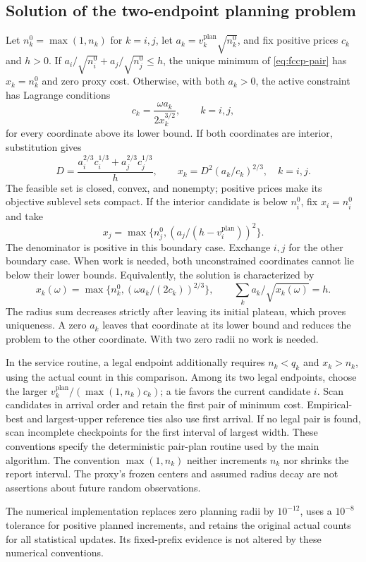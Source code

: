 \documentclass[11pt]{article}
\theoremstyle{remark}
\begin{document}
\subsection{Solution of the two-endpoint planning problem}
Let $n_k^0=\max(1,n_k)$ for $k=i,j$, let
$a_k=v_k^{\mathrm{plan}}\sqrt{n_k^0}$, and fix positive prices $c_k$
and $h>0$. If
$a_i/\sqrt{n_i^0}+a_j/\sqrt{n_j^0}\le h$, the unique minimum of
\eqref{eq:fccp-pair} has $x_k=n_k^0$ and zero proxy cost. Otherwise,
with both $a_k>0$, the active constraint has Lagrange conditions
\[
 c_k=\frac{\omega a_k}{2x_k^{3/2}},\qquad k=i,j,
\]
for every coordinate above its lower bound. If both coordinates are
interior, substitution gives
\begin{equation}\label{eq:fccp-pair-solution}
 D=\frac{a_i^{2/3}c_i^{1/3}+a_j^{2/3}c_j^{1/3}}h,\qquad
 x_k=D^2(a_k/c_k)^{2/3},\quad k=i,j.
\end{equation}
The feasible set is closed, convex, and nonempty; positive prices make
its objective sublevel sets compact. If the interior candidate is below
$n_i^0$, fix $x_i=n_i^0$ and take
\[
 x_j=\max\{n_j^0,(a_j/(h-v_i^{\mathrm{plan}}))^2\}.
\]
The denominator is positive in this boundary case. Exchange $i,j$ for
the other boundary case. When work is needed, both unconstrained
coordinates cannot lie below their lower bounds. Equivalently, the
solution is characterized by
\[
 x_k(\omega)=\max\{n_k^0,(\omega a_k/(2c_k))^{2/3}\},
 \qquad \sum_k a_k/\sqrt{x_k(\omega)}=h.
\]
The radius sum decreases strictly after leaving its initial plateau,
which proves uniqueness. A zero $a_k$ leaves that coordinate at its
lower bound and reduces the problem to the other coordinate. With two
zero radii no work is needed.

In the service routine, a legal endpoint additionally requires
$n_k<q_k$ and $x_k>n_k$, using the actual count in this comparison.
Among its two legal endpoints, choose the larger
$v_k^{\mathrm{plan}}/(\max(1,n_k)c_k)$; a tie favors the current
candidate $i$. Scan candidates in arrival order and retain the first
pair of minimum cost. Empirical-best and largest-upper reference ties
also use first arrival. If no legal pair is found, scan incomplete
checkpoints for the first interval of largest width. These conventions
specify the deterministic pair-plan routine used by the main algorithm.
The convention $\max(1,n_k)$ neither increments $n_k$ nor shrinks the
report interval. The proxy's frozen centers and assumed radius decay
are not assertions about future random observations.

The numerical implementation replaces zero planning radii by
$10^{-12}$, uses a $10^{-8}$ tolerance for positive planned increments,
and retains the original actual counts for all statistical updates.
Its fixed-prefix evidence is not altered by these numerical conventions.
\end{document}
